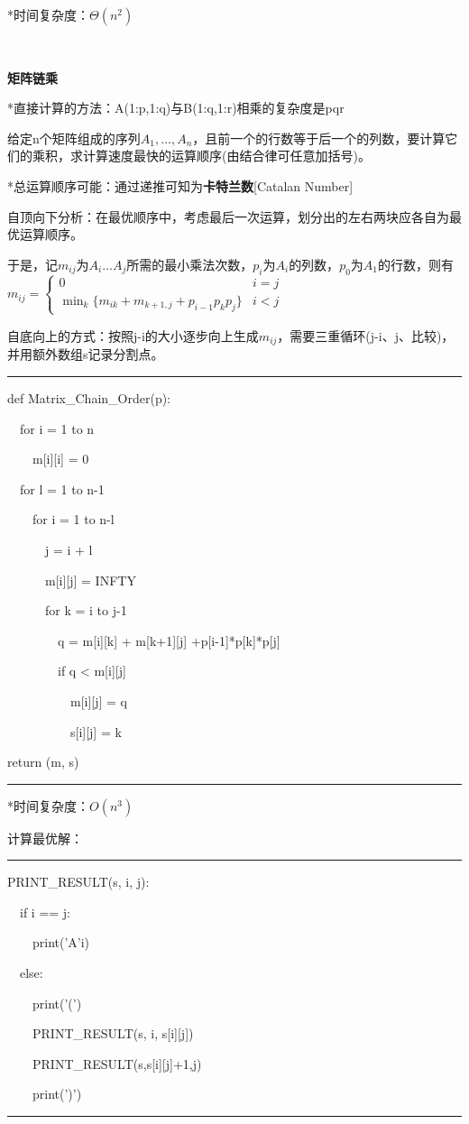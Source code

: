 \documentclass[a4paper,UTF8,fontset=windows]{ctexart}
\newenvironment{code}{\rule{36em}{0.1em}\setlength{\parindent}{1em}

}{

\setlength{\parindent}{0em}\rule{36em}{0.1em}}
\begin{document}
*\hspace{0em}时间复杂度：$\Theta(n^2)$

\

\textbf{矩阵链乘}

*\hspace{0em}直接计算的方法：A(1:p,1:q)与B(1:q,1:r)相乘的复杂度是pqr

给定n个矩阵组成的序列$A_1,\dots,A_n$，且前一个的行数等于后一个的列数，要计算它们的乘积，求计算速度最快的运算顺序(由结合律可任意加括号)。

*\hspace{0em}总运算顺序可能：通过递推可知为\textbf{卡特兰数}[Catalan Number]

自顶向下分析：在最优顺序中，考虑最后一次运算，划分出的左右两块应各自为最优运算顺序。

于是，记$m_{ij}$为$A_i\dots A_j$所需的最小乘法次数，$p_i$为$A_i$的列数，$p_0$为$A_1$的行数，则有$m_{ij}=\begin{cases}0&i=j\\\min_k\{m_{ik}+m_{k+1,j}+p_{i-1}p_kp_j\}&i<j\end{cases}$

自底向上的方式：按照j-i的大小逐步向上生成$m_{ij}$，需要三重循环(j-i、j、比较)，并用额外数组s记录分割点。

\begin{code}
def Matrix\_Chain\_Order(p):

\ \ for i = 1 to n

\ \ \ \ m[i][i] = 0

\ \ for l = 1 to n-1

\ \ \ \ for i = 1 to n-l

\ \ \ \ \ \ j = i + l

\ \ \ \ \ \ m[i][j] = INFTY

\ \ \ \ \ \ for k = i to j-1

\ \ \ \ \ \ \ \ q = m[i][k] + m[k+1][j] +p[i-1]*p[k]*p[j]

\ \ \ \ \ \ \ \ if q < m[i][j]

\ \ \ \ \ \ \ \ \ \ m[i][j] = q

\ \ \ \ \ \ \ \ \ \ s[i][j] = k

return (m, s)
\end{code}

*\hspace{0em}时间复杂度：$O(n^3)$

计算最优解：

\begin{code}
PRINT\_RESULT(s, i, j):

\ \ if i == j:

\ \ \ \ print('A'i)

\ \ else:

\ \ \ \ print('(')

\ \ \ \ PRINT\_RESULT(s, i, s[i][j])

\ \ \ \ PRINT\_RESULT(s,s[i][j]+1,j)

\ \ \ \ print(')')
\end{code}
\end{document}

